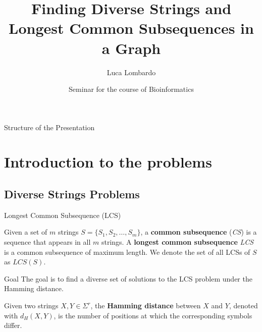 \documentclass{beamer}
\title{Finding Diverse Strings and Longest Common Subsequences in a Graph}
\author{Luca Lombardo}
\date{Seminar for the course of Bioinformatics}
\begin{document}
\begin{frame}
    \titlepage
\end{frame}


\begin{frame}{Structure of the Presentation}
    \tableofcontents
\end{frame}

\section{Introduction to the problems}
\subsection{Diverse Strings Problems}
\begin{frame}{Longest Common Subsequence (LCS)}
\begin{definition}
    Given a set of $m$ strings $S = \{ S_1, S_2, \ldots, S_m \}$, a \textbf{common subsequence} (\emph{CS}) is a sequence that appears in all $m$ strings. A \textbf{longest common subsequence} \emph{LCS} is a common subsequence of maximum length. We denote the set of all LCSs of $S$ as $LCS(S)$.
\end{definition}
\begin{alertblock}{Goal}
    The goal is to find a diverse set of solutions to the LCS problem under the Hamming distance.
\end{alertblock}
\begin{definition}
    Given two strings $X, Y \in \Sigma^r$, the \textbf{Hamming distance} between $X$ and $Y$, denoted with $d_H(X,Y)$, is the number of positions at which the corresponding symbols differ.
\end{definition}
\end{frame}


\end{document}
